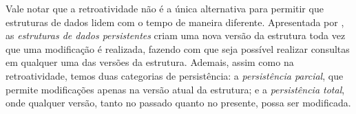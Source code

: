 

Vale notar que a retroatividade não é a única alternativa para permitir que estruturas de dados lidem com o tempo de maneira diferente. Apresentada por \citet{sarnak1986persistent}, as \emph{estruturas de dados persistentes} criam uma nova versão da estrutura toda vez que uma modificação é realizada, fazendo com que seja possível realizar consultas em qualquer uma das versões da estrutura. Ademais, assim como na retroatividade, temos duas categorias de persistência: a \emph{persistência parcial}, que permite modificações apenas na versão atual da estrutura; e a \emph{persistência total}, onde qualquer versão, tanto no passado quanto no presente, possa ser modificada.